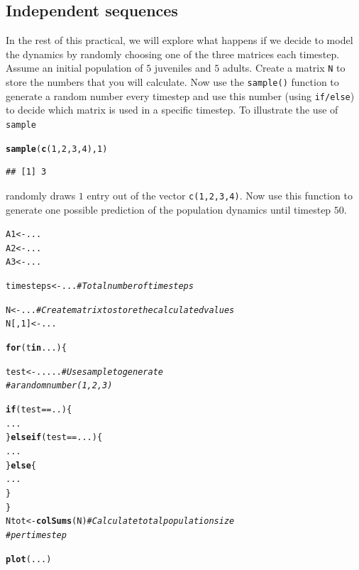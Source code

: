 \documentclass{article}\usepackage[]{graphicx}\usepackage[]{color}
\makeatletter
\newcommand{\hlnum}[1]{\textcolor[rgb]{0.686,0.059,0.569}{#1}}%
\newcommand{\hlcom}[1]{\textcolor[rgb]{0.678,0.584,0.686}{\textit{#1}}}%
\newcommand{\hlopt}[1]{\textcolor[rgb]{0,0,0}{#1}}%
\newcommand{\hlstd}[1]{\textcolor[rgb]{0.345,0.345,0.345}{#1}}%
\newcommand{\hlkwa}[1]{\textcolor[rgb]{0.161,0.373,0.58}{\textbf{#1}}}%
\newcommand{\hlkwb}[1]{\textcolor[rgb]{0.69,0.353,0.396}{#1}}%
\newcommand{\hlkwd}[1]{\textcolor[rgb]{0.737,0.353,0.396}{\textbf{#1}}}%
\newenvironment{kframe}{%
 \def\at@end@of@kframe{}%
 \ifinner\ifhmode%
  \def\at@end@of@kframe{\end{minipage}}%
  \begin{minipage}{\columnwidth}%
 \fi\fi%
 \def\FrameCommand##1{\hskip\@totalleftmargin \hskip-\fboxsep
 \colorbox{shadecolor}{##1}\hskip-\fboxsep
     \hskip-\linewidth \hskip-\@totalleftmargin \hskip\columnwidth}%
 \MakeFramed {\advance\hsize-\width
   \@totalleftmargin\z@ \linewidth\hsize
   \@setminipage}}%
 {\par\unskip\endMakeFramed%
 \at@end@of@kframe}
\newenvironment{knitrout}{}{} %
\makeatother
\begin{document}
\subsection{Independent sequences}
In the rest of this practical, we will explore what happens if we decide to model the dynamics by randomly choosing one of the three matrices each timestep. Assume an initial population of $5$ juveniles and $5$ adults. Create a matrix \texttt{N} to store the numbers that you will calculate. Now use the \texttt{sample()} function to generate a random number every timestep and use this number (using \texttt{if/else}) to decide which matrix is used in a specific timestep. To illustrate the use of \texttt{sample}
\begin{knitrout}
\color{fgcolor}\begin{kframe}
\begin{alltt}
\hlkwd{sample}\hlstd{(}\hlkwd{c}\hlstd{(}\hlnum{1}\hlstd{,}\hlnum{2}\hlstd{,}\hlnum{3}\hlstd{,}\hlnum{4}\hlstd{),}\hlnum{1}\hlstd{)}
\end{alltt}
\begin{verbatim}
## [1] 3
\end{verbatim}
\end{kframe}
\end{knitrout}
randomly draws $1$ entry out of the vector \texttt{c(1,2,3,4)}. Now use this function to generate one possible prediction of the population dynamics until timestep $50$.
\begin{knitrout}
\color{fgcolor}\begin{kframe}
\begin{alltt}
\hlstd{A1}\hlkwb{<-}\hlstd{...}
\hlstd{A2}\hlkwb{<-}\hlstd{...}
\hlstd{A3}\hlkwb{<-}\hlstd{...}

\hlstd{timesteps}\hlkwb{<-}\hlstd{...} \hlcom{# Total number of timesteps}

\hlstd{N}\hlkwb{<-}\hlstd{...} \hlcom{# Create matrix to store the calculated values}
\hlstd{N[,}\hlnum{1}\hlstd{]}\hlkwb{<-}\hlstd{...}

\hlkwa{for}\hlstd{(t} \hlkwa{in} \hlstd{...)\{}

  \hlstd{test}\hlkwb{<-}\hlstd{.....} \hlcom{# Use sample to generate }
              \hlcom{# a random number (1,2,3)}

  \hlkwa{if}\hlstd{(test}\hlopt{==}\hlstd{..)\{}
    \hlstd{...}
  \hlstd{\}}\hlkwa{else if}\hlstd{(test}\hlopt{==}\hlstd{...)\{}
    \hlstd{...}
  \hlstd{\}}\hlkwa{else}\hlstd{\{}
    \hlstd{...}
  \hlstd{\}}
\hlstd{\}}
\hlstd{Ntot}\hlkwb{<-}\hlkwd{colSums}\hlstd{(N)}  \hlcom{# Calculate total population size}
                  \hlcom{# per timestep}

\hlkwd{plot}\hlstd{(...)}
\end{alltt}
\end{kframe}
\end{knitrout}
\end{document}
